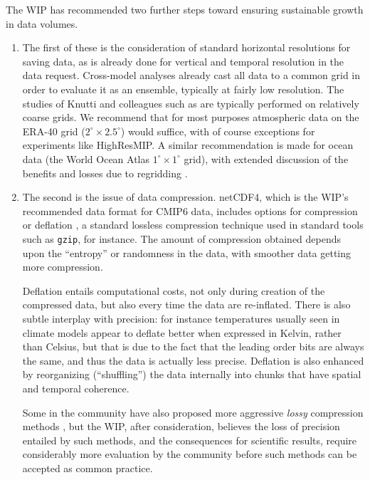 \documentclass[gmd,manuscript]{copernicus}
\newcommand{\bibref}[1] { \cite{ref:#1}}
\newcommand{\pipref}[1] {\citep{ref:#1}}
\begin{document}
The WIP has recommended two further steps toward ensuring sustainable
growth in data volumes.

\begin{enumerate}
\item The first of these is the consideration of standard horizontal
  resolutions for saving data, as is already done for vertical and
  temporal resolution in the data request. Cross-model analyses
  already cast all data to a common grid in order to evaluate it as an
  ensemble, typically at fairly low resolution. The studies of Knutti
  and colleagues such as \bibref{knuttietal2017} are typically
  performed on relatively coarse grids. We recommend that for most
  purposes atmospheric data on the ERA-40 grid
  ($2^\circ\times 2.5^\circ$) would suffice, with of course exceptions
  for experiments like HighResMIP. A similar recommendation is made
  for ocean data (the World Ocean Atlas $1^\circ\times 1^\circ$ grid),
  with extended discussion of the benefits and losses due to
  regridding \citep[see][]{ref:griffiesetal2014,ref:griffiesetal2016}.
\item The second is the issue of data compression. netCDF4, which is
  the WIP's recommended data format for CMIP6 data, includes options
  for compression or deflation \pipref{zivlempel1977}, a
  standard lossless compression technique used in standard tools such
  as \texttt{gzip}, for instance. The amount of compression obtained
  depends upon the ``entropy'' or randomness in the data, with
  smoother data getting more compression.

  Deflation entails computational costs, not only during creation of
  the compressed data, but also every time the data are re-inflated.
  There is also subtle interplay with precision: for instance
  temperatures usually seen in climate models appear to deflate better
  when expressed in Kelvin, rather than Celsius, but that is due to
  the fact that the leading order bits are always the same, and thus
  the data is actually less precise. Deflation is also enhanced by
  reorganizing (``shuffling'') the data internally into chunks that
  have spatial and temporal coherence.

  Some in the community have also proposed more aggressive
  \emph{lossy} compression methods \pipref{bakeretal2016}, but the
  WIP, after consideration, believes the loss of precision entailed by
  such methods, and the consequences for scientific results, require
  considerably more evaluation by the community before such methods
  can be accepted as common practice.


\end{enumerate}
\end{document}
